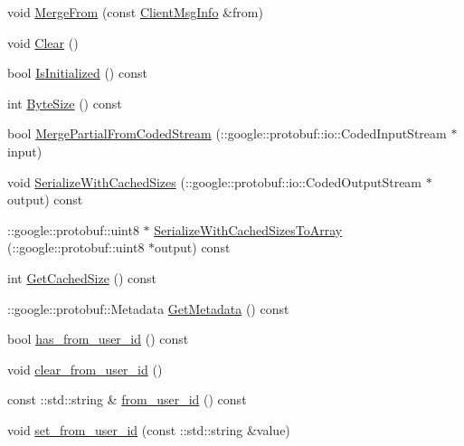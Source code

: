 \begin{DoxyCompactItemize}
\item 
void \hyperlink{class_i_m_1_1_base_define_1_1_client_msg_info_a161d48d0b9244bb83e509648280df19b}{Merge\+From} (const \hyperlink{class_i_m_1_1_base_define_1_1_client_msg_info}{Client\+Msg\+Info} \&from)
\item 
void \hyperlink{class_i_m_1_1_base_define_1_1_client_msg_info_ac60d0e49e3caca3f8bdf1e0487157ebb}{Clear} ()
\item 
bool \hyperlink{class_i_m_1_1_base_define_1_1_client_msg_info_adcc2c44bbf8239b4bc1569d0eef95a00}{Is\+Initialized} () const 
\item 
int \hyperlink{class_i_m_1_1_base_define_1_1_client_msg_info_a9d9789362bf65efb87425bab1d84d46b}{Byte\+Size} () const 
\item 
bool \hyperlink{class_i_m_1_1_base_define_1_1_client_msg_info_afcb5ff22846b838adad4bfc04c3ce98e}{Merge\+Partial\+From\+Coded\+Stream} (\+::google\+::protobuf\+::io\+::\+Coded\+Input\+Stream $\ast$input)
\item 
void \hyperlink{class_i_m_1_1_base_define_1_1_client_msg_info_a5ea5844c36e9672a7e3e444bb5bcd9d7}{Serialize\+With\+Cached\+Sizes} (\+::google\+::protobuf\+::io\+::\+Coded\+Output\+Stream $\ast$output) const 
\item 
\+::google\+::protobuf\+::uint8 $\ast$ \hyperlink{class_i_m_1_1_base_define_1_1_client_msg_info_acfcb42b58c4c20c9b4186604bd2b1821}{Serialize\+With\+Cached\+Sizes\+To\+Array} (\+::google\+::protobuf\+::uint8 $\ast$output) const 
\item 
int \hyperlink{class_i_m_1_1_base_define_1_1_client_msg_info_a95d6973000c99d8c6fea0182ccab24fa}{Get\+Cached\+Size} () const 
\item 
\+::google\+::protobuf\+::\+Metadata \hyperlink{class_i_m_1_1_base_define_1_1_client_msg_info_ab3fe53be4477aa5ba51115b361e4b7bd}{Get\+Metadata} () const 
\item 
bool \hyperlink{class_i_m_1_1_base_define_1_1_client_msg_info_aa9b4c4cabb2468159a0cfdfad248ce0a}{has\+\_\+from\+\_\+user\+\_\+id} () const 
\item 
void \hyperlink{class_i_m_1_1_base_define_1_1_client_msg_info_a641ad988e4072d8475235b6401cf6824}{clear\+\_\+from\+\_\+user\+\_\+id} ()
\item 
const \+::std\+::string \& \hyperlink{class_i_m_1_1_base_define_1_1_client_msg_info_ac24e846f0ccde4847d1dba20386ae484}{from\+\_\+user\+\_\+id} () const 
\item 
void \hyperlink{class_i_m_1_1_base_define_1_1_client_msg_info_a813019dd7785f7e9d5f0bafbf56654df}{set\+\_\+from\+\_\+user\+\_\+id} (const \+::std\+::string \&value)

\end{DoxyCompactItemize}
